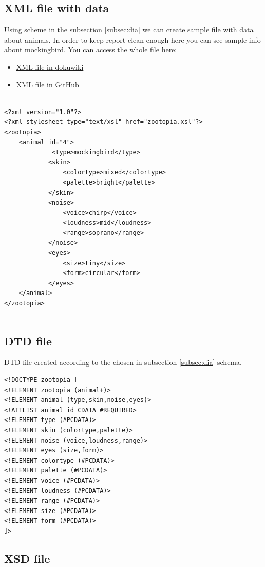 \documentclass{article}
\begin{document}
\subsection{XML file with data}
Using scheme in the subsection \ref{subsec:dia} we can create sample file with data about animals.
In order to keep report clean enough here you can see sample info about mockingbird. You can access the whole file here:
\begin{itemize}
    \item \href{http://188.130.155.38:11180/doku.php?id=xml_xsd_dtd#xml_file}{XML file in dokuwiki}
    \item \href{https://github.com/tyvision/innolabs_es/blob/master/lab1/zootopia.xml}{XML file in GitHub}
\end{itemize}

\begin{verbatim}

<?xml version="1.0"?>
<?xml-stylesheet type="text/xsl" href="zootopia.xsl"?>
<zootopia>
    <animal id="4">
             <type>mockingbird</type>
            <skin>
                <colortype>mixed</colortype>
                <palette>bright</palette>
            </skin>
            <noise>
                <voice>chirp</voice>
                <loudness>mid</loudness>
                <range>soprano</range>
            </noise>
            <eyes>
                <size>tiny</size>
                <form>circular</form>
            </eyes>
    </animal> 
</zootopia>
   
\end{verbatim}

\subsection{DTD file}
DTD file created according to the chosen in subsection \ref{subsec:dia} schema.
\begin{verbatim}
<!DOCTYPE zootopia [
<!ELEMENT zootopia (animal+)>
<!ELEMENT animal (type,skin,noise,eyes)>
<!ATTLIST animal id CDATA #REQUIRED>
<!ELEMENT type (#PCDATA)>
<!ELEMENT skin (colortype,palette)>
<!ELEMENT noise (voice,loudness,range)>
<!ELEMENT eyes (size,form)>
<!ELEMENT colortype (#PCDATA)>
<!ELEMENT palette (#PCDATA)>
<!ELEMENT voice (#PCDATA)>
<!ELEMENT loudness (#PCDATA)>
<!ELEMENT range (#PCDATA)>
<!ELEMENT size (#PCDATA)>
<!ELEMENT form (#PCDATA)>
]>
\end{verbatim}


\subsection{XSD file}
\end{document}
